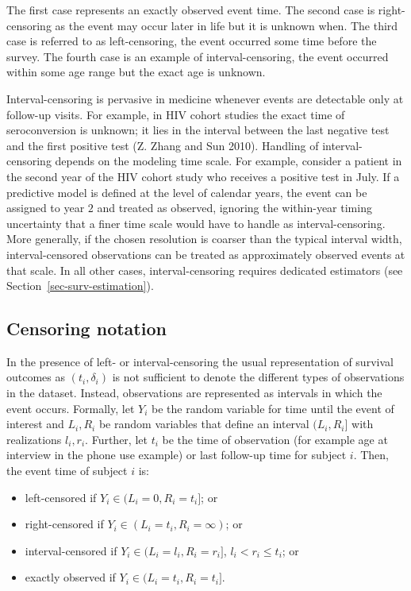 \documentclass[
  letterpaper,
  krantz2]{style/krantz}
\providecommand{\tightlist}{%
  \setlength{\itemsep}{0pt}\setlength{\parskip}{0pt}}
\begin{document}
The first case represents an exactly observed event time. The second
case is right-censoring as the event may occur later in life but it is
unknown when. The third case is referred to as left-censoring, the event
occurred some time before the survey. The fourth case is an example of
interval-censoring, the event occurred within some age range but the
exact age is unknown.

Interval-censoring is pervasive in medicine whenever events are
detectable only at follow-up visits. For example, in HIV cohort studies
the exact time of seroconversion is unknown; it lies in the interval
between the last negative test and the first positive test (Z. Zhang and
Sun 2010). Handling of interval-censoring depends on the modeling time
scale. For example, consider a patient in the second year of the HIV
cohort study who receives a positive test in July. If a predictive model
is defined at the level of calendar years, the event can be assigned to
year \(2\) and treated as observed, ignoring the within-year timing
uncertainty that a finer time scale would have to handle as
interval-censoring. More generally, if the chosen resolution is coarser
than the typical interval width, interval-censored observations can be
treated as approximately observed events at that scale. In all other
cases, interval-censoring requires dedicated estimators (see
Section~\ref{sec-surv-estimation}).

\subsection{Censoring notation}\label{sec-types-of-censoring-notation}

In the presence of left- or interval-censoring the usual representation
of survival outcomes as \((t_i, \delta_i)\) is not sufficient to denote
the different types of observations in the dataset. Instead,
observations are represented as intervals in which the event occurs.
Formally, let \(Y_i\) be the random variable for time until the event of
interest and \(L_i, R_i\) be random variables that define an interval
\((L_i,R_i]\) with realizations \(l_i, r_i\). Further, let \(t_i\) be
the time of observation (for example age at interview in the phone use
example) or last follow-up time for subject \(i\). Then, the event time
of subject \(i\) is:

\begin{itemize}
\tightlist
\item
  left-censored if \(Y_i \in (L_i = 0, R_i = t_i]\); or
\item
  right-censored if \(Y_i \in (L_i = t_i, R_i = \infty)\); or
\item
  interval-censored if \(Y_i \in (L_i = l_i, R_i = r_i]\),
  \(l_i < r_i \leq t_i\); or
\item
  exactly observed if \(Y_i \in (L_i = t_i, R_i = t_i]\).
\end{itemize}
\end{document}
